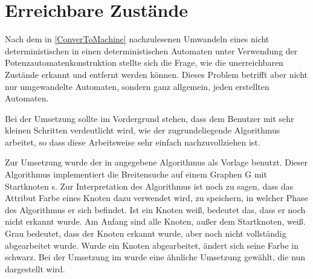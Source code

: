 \section{Erreichbare Zustände}\label{ReachableStates}

Nach dem in \ref{ConverToMachine} nachzulesenen Umwandeln eines nicht
deterministischen in einen deterministischen Automaten unter Verwendung der
Potenzautomatenkonstruktion stellte sich die Frage, wie die unerreichbaren
Zustände erkannt und entfernt werden können. Dieses Problem betrifft aber nicht
nur umgewandelte Automaten, sondern ganz allgemein, jeden erstellten
Automaten.\vspace{10pt}

Bei der Umsetzung sollte im Vordergrund stehen, dass dem Benutzer mit sehr
kleinen Schritten verdeutlicht wird, wie der zugrundeliegende Algorithmus
arbeitet, so dass diese Arbeitsweise sehr einfach nachzuvollziehen
ist.\vspace{10pt}

Zur Umsetzung wurde der in \cite[S. 536]{Algorithmen} angegebene Algorithmus
als Vorlage benutzt. Dieser Algorithmus implementiert die Breitensuche auf
einem Graphen G mit Startknoten s. Zur Interpretation des Algorithmus ist noch
zu sagen, dass das Attribut Farbe eines Knoten dazu verwendet wird, zu
speichern, in welcher Phase des Algorithmus er sich befindet. Ist ein Knoten
weiß, bedeutet das, dass er noch nicht erkannt wurde. Am Anfang sind alle
Knoten, außer dem Startknoten, weiß. Grau bedeutet, dass der Knoten erkannt
wurde, aber noch nicht vollständig abgearbeitet wurde. Wurde ein Knoten
abgearbeitet, ändert sich seine Farbe in schwarz. Bei der Umsetzung im \gtitool
wurde eine ähnliche Umsetzung gewählt, die nun dargestellt wird.\vspace{10pt}

